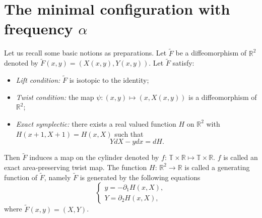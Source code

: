 \documentclass{amsart}
\newcounter{item}[section]
\theoremstyle{definition}
\begin{document}
\vspace{2em}



\section{The minimal configuration with frequency $\alpha$}\label{S2}
Let us recall some basic notions as preparations. Let $\tilde{F}$ be a diffeomorphism of $\mathbb{R}^2$ denoted by $\tilde{F}(x,y)=(X(x,y),Y(x,y))$. Let $\tilde{F}$ satisfy:
\begin{itemize}
	\item {\it Lift condition:} $\tilde{F}$ is isotopic to the identity;
	\item {\it Twist condition:} the map $\psi:(x,y)\mapsto(x,X(x,y))$ is a diffeomorphism of $\mathbb{R}^2$;
	\item {\it Exact symplectic:} there exists a real valued function $H$ on $\mathbb{R}^2$ with $H(x+1,X+1)=H(x,X)$ such that
	\[YdX-ydx=dH.\]
\end{itemize}
Then $\tilde{F}$ induces a map on the cylinder denoted by $f$: $\mathbb{T}\times\mathbb{R}\mapsto \mathbb{T}\times\mathbb{R}$. $f$ is called an exact
area-preserving  twist map. The function  $H$: $\mathbb{R}^2\rightarrow\mathbb{R}$ is called
a generating function of $\tilde{F}$, namely $\tilde{F}$
is generated by the following equations
\begin{equation*}
	\begin{cases}
		y=-\partial_1 H(x,X),\\
		Y=\partial_2 H(x,X),
	\end{cases}
\end{equation*}
where $\tilde{F}(x,y)=(X,Y)$.
\end{document}
